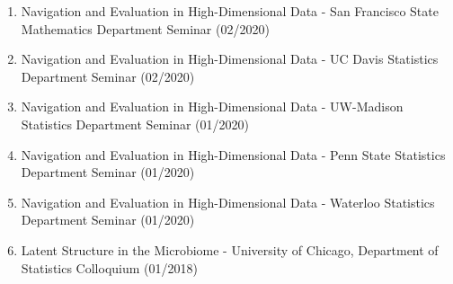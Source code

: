 \documentclass[letterpaper]{article}
\begin{document}
\begin{enumerate}
  \item Navigation and Evaluation in High-Dimensional Data - San Francisco State Mathematics Department Seminar (02/2020)
  \item Navigation and Evaluation in High-Dimensional Data - UC Davis Statistics Department Seminar (02/2020)
  \item Navigation and Evaluation in High-Dimensional Data - UW-Madison Statistics Department Seminar (01/2020)
  \item Navigation and Evaluation in High-Dimensional Data - Penn State Statistics Department Seminar (01/2020)
  \item Navigation and Evaluation in High-Dimensional Data - Waterloo Statistics Department Seminar (01/2020)
  \item Latent Structure in the Microbiome - University of Chicago, Department of Statistics Colloquium (01/2018)
\end{enumerate}
\end{document}

